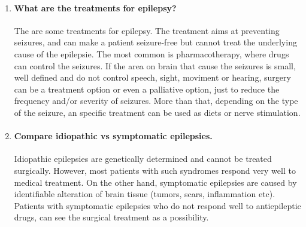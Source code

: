\documentclass[12pt,article,oneside,a4paper]{memoir}
\begin{document}
\begin{enumerate}
\item \paragraph{What are the treatments for epilepsy?}
The are some treatments for epilepsy. The treatment aims at preventing
seizures, and can make a patient seizure-free but cannot treat the underlying
cause of the epilepsie. The most common is pharmacotherapy, where drugs can
control the seizures. If the area on brain that cause the seizures is small,
well defined and do not control speech, sight, moviment or hearing, surgery can
be a treatment option or even a palliative option, just to reduce the frequency
and/or severity of seizures. More than that, depending on the type of the
seizure, an specific treatment can be used as diets or nerve stimulation.

\item \paragraph{Compare idiopathic vs symptomatic epilepsies.}
Idiopathic epilepsies are genetically determined and cannot be treated
surgically. However, most patients with such syndromes respond very well to
medical treatment.
On the other hand, symptomatic epilepsies are caused by identifiable alteration
of brain tissue (tumors, scars, inflammation etc). Patients with symptomatic
epilepsies who do not respond well to antiepileptic drugs, can see the surgical
treatment as a possibility.

\end{enumerate}

\end{document}
